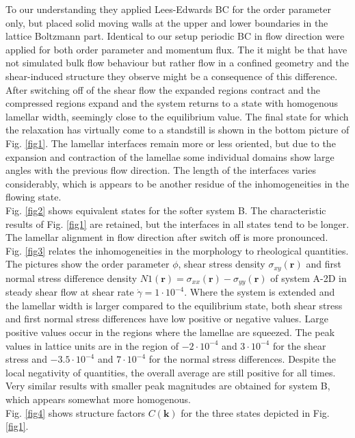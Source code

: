 \documentclass[8.5pt,twoside,twocolumn]{article}
\newcommand{\e}[1]{\cdot10^{#1}}
\begin{document}
To our understanding they applied Lees-Edwards BC for the order parameter only, but placed solid moving walls at the upper and lower boundaries in the lattice Boltzmann part.
Identical to our setup periodic BC in flow direction were applied for both order parameter and momentum flux.
The it might be that \cite{Xu06b} have not simulated bulk flow behaviour but rather flow in a confined geometry and the shear-induced structure they observe might be a consequence of this difference.\\ 
After switching off of the shear flow the expanded regions contract and the compressed regions expand and the system returns to a state with homogenous lamellar width, seemingly close to the equilibrium value.
The final state for which the relaxation has virtually come to a standstill is shown in the bottom picture of Fig. \ref{fig1}. 
The lamellar interfaces remain more or less oriented, but due to the expansion and contraction of the lamellae some individual domains show large angles with the previous flow direction. 
The length of the interfaces varies considerably, which is appears to be another residue of the inhomogeneities in the flowing state.\\
Fig. \ref{fig2} shows equivalent states for the softer system B.
The characteristic results of Fig. \ref{fig1} are retained, but the interfaces in all states tend to be longer.
The lamellar alignment in flow direction after switch off is more pronounced.\\ 
Fig. \ref{fig3} relates the inhomogeneities in the morphology to rheological quantities.
The pictures show the order parameter $\phi$, shear stress density $\sigma_{xy}({\bm r})$ and first normal stress difference density $N1({\bm r})=\sigma_{xx}({\bm r})-\sigma_{yy}({\bm r})$ of system A-2D in steady shear flow at shear rate $\dot{\gamma}=1\e{-4}$.
Where the system is extended and the lamellar width is larger compared to the equilibrium state, both shear stress and first normal stress differences have low positive or negative values.
Large positive values occur in the regions where the lamellae are squeezed.
The peak values in lattice units are in the region of $-2\e{-4}$ and $3\e{-4}$ for the shear stress and  $-3.5\e{-4}$ and $7\e{-4}$ for the normal stress differences.
Despite the local negativity of quantities, the overall average are still positive for all times.
Very similar results with smaller peak magnitudes are obtained for system B, which appears somewhat more homogenous.\\
Fig. \ref{fig4} shows structure factors $C({\bm k})$ for the three states depicted in Fig. \ref{fig1}.
\end{document}
